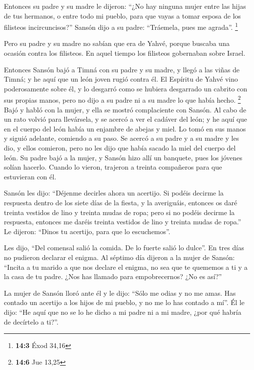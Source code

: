 \begin{paracol}{2}
 Entonces su padre y su madre le dijeron: ``¿No hay
ninguna mujer entre las hijas de tus hermanos, o entre todo mi pueblo,
para que vayas a tomar esposa de los filisteos incircuncisos?'' Sansón
dijo a su padre: ``Tráemela, pues me agrada''. \footnote{\textbf{14:3}
  Éxod 34,16}

 Pero su padre y su madre no sabían que era de Yahvé,
porque buscaba una ocasión contra los filisteos. En aquel tiempo los
filisteos gobernaban sobre Israel.

 Entonces Sansón bajó a Timná con su padre y su madre, y
llegó a las viñas de Timná; y he aquí que un león joven rugió contra él.
 El Espíritu de Yahvé vino poderosamente sobre él, y lo
desgarró como se hubiera desgarrado un cabrito con sus propias manos,
pero no dijo a su padre ni a su madre lo que había hecho. \footnote{\textbf{14:6}
  Jue 13,25}  Bajó y habló con la mujer, y ella se mostró
complaciente con Sansón.  Al cabo de un rato volvió para
llevársela, y se acercó a ver el cadáver del león; y he aquí que en el
cuerpo del león había un enjambre de abejas y miel.  Lo
tomó en sus manos y siguió adelante, comiendo a su paso. Se acercó a su
padre y a su madre y les dio, y ellos comieron, pero no les dijo que
había sacado la miel del cuerpo del león.  Su padre bajó
a la mujer, y Sansón hizo allí un banquete, pues los jóvenes solían
hacerlo.  Cuando lo vieron, trajeron a treinta compañeros
para que estuvieran con él.

 Sansón les dijo: ``Déjenme decirles ahora un acertijo.
Si podéis decirme la respuesta dentro de los siete días de la fiesta, y
la averiguáis, entonces os daré treinta vestidos de lino y treinta mudas
de ropa;  pero si no podéis decirme la respuesta,
entonces me daréis treinta vestidos de lino y treinta mudas de ropa.''
Le dijeron: ``Dinos tu acertijo, para que lo escuchemos''.

 Les dijo, ``Del comensal salió la comida. De lo fuerte
salió lo dulce''. En tres días no pudieron declarar el enigma.
 Al séptimo día dijeron a la mujer de Sansón: ``Incita a
tu marido a que nos declare el enigma, no sea que te quememos a ti y a
la casa de tu padre. ¿Nos has llamado para empobrecernos? ¿No es así?''

 La mujer de Sansón lloró ante él y le dijo: ``Sólo me
odias y no me amas. Has contado un acertijo a los hijos de mi pueblo, y
no me lo has contado a mí''. Él le dijo: ``He aquí que no se lo he dicho
a mi padre ni a mi madre, ¿por qué habría de decírtelo a ti?''.


\end{paracol}
